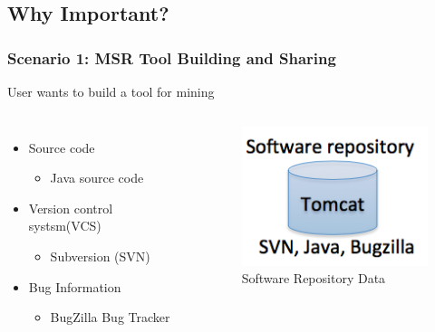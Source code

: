         \subsection{Why Important?}
        \begin{frame}
            \frametitle{Scenario 1: MSR Tool Building and Sharing}
        User wants to build a tool for mining
            \begin{columns}
                    \begin{itemize}
                      \item Source code
                          \begin{itemize}
                            \item Java source code
                          \end{itemize}
                      \item Version control systsm(VCS)
                          \begin{itemize}
                            \item Subversion (SVN)
                          \end{itemize}
                      \item Bug Information
                          \begin{itemize}
                            \item BugZilla Bug Tracker
                          \end{itemize}
                    \end{itemize}

                    \begin{figure}
                    \centering
                    \includegraphics[width=0.60\linewidth]{figures/tomcat.png}
                    \caption{\tiny{Software Repository Data}}
                    \end{figure}

            \end{columns}
        \end{frame}

